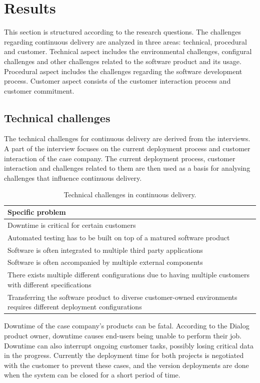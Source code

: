 \documentclass[lnbip]{svmultln}
\begin{document}
\section{Results}
This section is structured according to the research questions. The challenges regarding continuous delivery are analyzed in three areas: technical, procedural and customer. Technical aspect includes the environmental challenges, configural challenges and other challenges related to the software product and its usage. Procedural aspect includes the challenges regarding the software development process. Customer aspect consists of the customer interaction process and customer commitment.

\subsection{Technical challenges}
The technical challenges for continuous delivery are derived from the interviews. A part of the interview focuses on the current deployment process and customer interaction of the case company. The current deployment process, customer interaction and challenges related to them are then used as a basis for analysing challenges that influence continuous delivery. 

\begin{table}[htb]
    \begin{tabular}{ | p{12cm} |}
    \hline
    \textbf{Specific problem} \\ \hline
    Downtime is critical for certain customers \\ \hline
    Automated testing has to be built on top of a matured software product \\ \hline
    Software is often integrated to multiple third party applications \\ \hline
    Software is often accompanied by multiple external components \\ \hline
    There exists multiple different configurations due to having multiple customers with different specifications \\ \hline
    Transferring the software product to diverse customer-owned environments requires different deployment configurations \\ 
    \hline
    \end{tabular}
    \caption{Technical challenges in continuous delivery.}
    \end{table}

Downtime of the case company's products can be fatal. According to the Dialog product owner, downtime causes end-users being unable to perform their job. Downtime can also interrupt ongoing customer tasks, possibly losing critical data in the progress. Currently the deployment time for both projects is negotiated with the customer to prevent these cases, and the version deployments are done when the system can be closed for a short period of time. 
\end{document}
